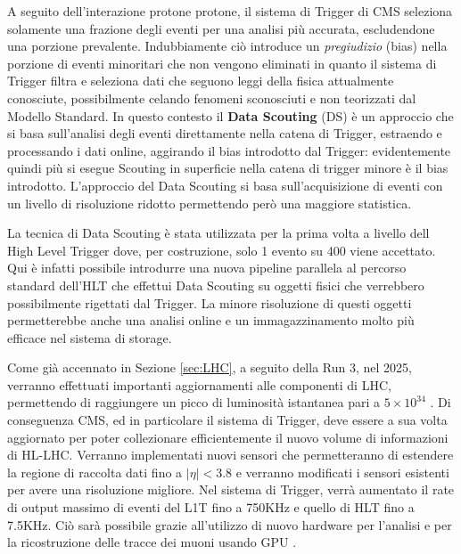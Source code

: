 A seguito dell'interazione protone protone, il sistema di Trigger di CMS seleziona solamente una frazione degli eventi per una analisi più accurata, escludendone una porzione prevalente. Indubbiamente ciò introduce un \textit{pregiudizio} (bias) nella porzione di eventi minoritari che non vengono eliminati in quanto il sistema di Trigger filtra e seleziona dati che seguono leggi della fisica attualmente conosciute, possibilmente celando fenomeni sconosciuti e non teorizzati dal Modello Standard. \newline
In questo contesto il \textbf{ Data Scouting} (DS) è un approccio che si basa sull'analisi degli eventi direttamente nella catena di Trigger, estraendo e processando i dati online, aggirando il bias introdotto dal Trigger: evidentemente quindi più si esegue Scouting in superficie nella catena di trigger minore è il bias introdotto. L'approccio del Data Scouting si basa sull'acquisizione di eventi con un livello di risoluzione ridotto permettendo però una maggiore statistica.

La tecnica di Data Scouting è stata utilizzata per la prima volta a livello dell High Level Trigger dove, per costruzione, solo 1 evento su 400 viene accettato. Qui è infatti possibile introdurre una nuova pipeline parallela al percorso standard dell'HLT che effettui Data Scouting su oggetti fisici che verrebbero possibilmente rigettati dal Trigger. La minore risoluzione di questi oggetti permetterebbe anche una analisi online e un immagazzinamento molto più efficace nel sistema di storage. 

Come già accennato in Sezione \ref{sec:LHC}, a seguito della Run 3, nel 2025, verranno effettuati importanti aggiornamenti alle componenti di LHC, permettendo di raggiungere un picco di luminosità istantanea pari a $5 \times 10^{34}$ \Lumi. Di conseguenza CMS, ed in particolare il sistema di Trigger, deve essere a sua volta aggiornato per poter collezionare efficientemente il nuovo volume di informazioni di HL-LHC. Verranno implementati nuovi sensori che permetteranno di estendere la regione di raccolta dati fino a $|\eta| < 3.8$ e verranno modificati i sensori esistenti per avere una risoluzione migliore. Nel sistema di Trigger, verrà aumentato il rate di output massimo di eventi del L1T fino a 750KHz e quello di HLT fino a 7.5KHz. Ciò sarà possibile grazie all'utilizzo di nuovo hardware per l'analisi e per la ricostruzione delle tracce dei muoni usando GPU \cite{collaboration2021phase}.


